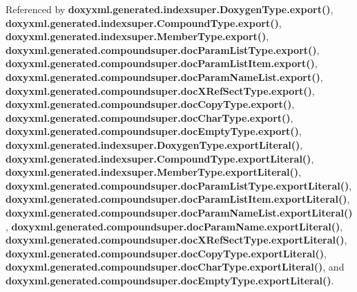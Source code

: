 Referenced by {\bf doxyxml.\+generated.\+indexsuper.\+Doxygen\+Type.\+export()}, {\bf doxyxml.\+generated.\+indexsuper.\+Compound\+Type.\+export()}, {\bf doxyxml.\+generated.\+indexsuper.\+Member\+Type.\+export()}, {\bf doxyxml.\+generated.\+compoundsuper.\+doc\+Param\+List\+Type.\+export()}, {\bf doxyxml.\+generated.\+compoundsuper.\+doc\+Param\+List\+Item.\+export()}, {\bf doxyxml.\+generated.\+compoundsuper.\+doc\+Param\+Name\+List.\+export()}, {\bf doxyxml.\+generated.\+compoundsuper.\+doc\+X\+Ref\+Sect\+Type.\+export()}, {\bf doxyxml.\+generated.\+compoundsuper.\+doc\+Copy\+Type.\+export()}, {\bf doxyxml.\+generated.\+compoundsuper.\+doc\+Char\+Type.\+export()}, {\bf doxyxml.\+generated.\+compoundsuper.\+doc\+Empty\+Type.\+export()}, {\bf doxyxml.\+generated.\+indexsuper.\+Doxygen\+Type.\+export\+Literal()}, {\bf doxyxml.\+generated.\+indexsuper.\+Compound\+Type.\+export\+Literal()}, {\bf doxyxml.\+generated.\+indexsuper.\+Member\+Type.\+export\+Literal()}, {\bf doxyxml.\+generated.\+compoundsuper.\+doc\+Param\+List\+Type.\+export\+Literal()}, {\bf doxyxml.\+generated.\+compoundsuper.\+doc\+Param\+List\+Item.\+export\+Literal()}, {\bf doxyxml.\+generated.\+compoundsuper.\+doc\+Param\+Name\+List.\+export\+Literal()}, {\bf doxyxml.\+generated.\+compoundsuper.\+doc\+Param\+Name.\+export\+Literal()}, {\bf doxyxml.\+generated.\+compoundsuper.\+doc\+X\+Ref\+Sect\+Type.\+export\+Literal()}, {\bf doxyxml.\+generated.\+compoundsuper.\+doc\+Copy\+Type.\+export\+Literal()}, {\bf doxyxml.\+generated.\+compoundsuper.\+doc\+Char\+Type.\+export\+Literal()}, and {\bf doxyxml.\+generated.\+compoundsuper.\+doc\+Empty\+Type.\+export\+Literal()}.



